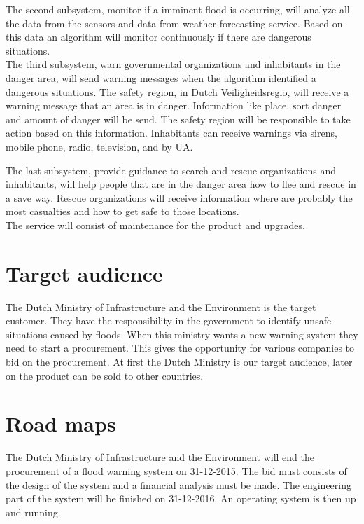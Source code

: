 The second subsystem, monitor if a imminent flood is occurring, will analyze all the data from the sensors and data from weather forecasting service. Based on this data an algorithm will monitor continuously if there are dangerous situations.\\

The third subsystem, warn governmental organizations and inhabitants in the danger area, will send warning messages when the algorithm identified a dangerous situations. The safety region, in Dutch Veiligheidsregio, will receive a warning message that an area is in danger. Information like place, sort danger and amount of danger will be send. The safety region will be responsible to take action based on this information. Inhabitants can receive warnings via sirens, mobile phone, radio, television, and by UA.

The last subsystem, provide guidance to search and rescue organizations and inhabitants, will help people that are in the danger area how to flee and rescue in a save way. Rescue organizations will receive information where are probably the most casualties and how to get safe to those locations.\\


The service will consist of maintenance for the product and upgrades.

\section{Target audience}
The Dutch Ministry of Infrastructure and the Environment is the target customer. They have the responsibility in the government to identify unsafe situations caused by floods. When this ministry wants a new warning system they need to start a procurement. This gives the opportunity for various companies to bid on the procurement. At first the Dutch Ministry is our target audience, later on the product can be sold to other countries.


\section{Road maps}
The Dutch Ministry of Infrastructure and the Environment will end the procurement of a flood warning system on 31-12-2015. The bid must consists of the design of the system and a financial analysis must be made. The engineering part of the system will be finished on 31-12-2016. An operating system is then up and running.

